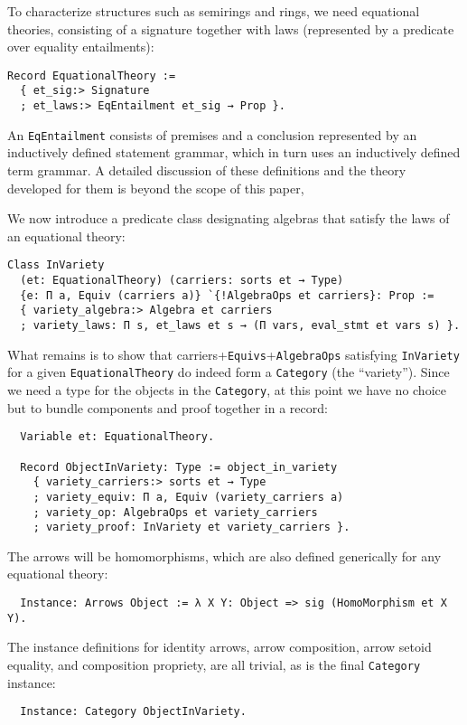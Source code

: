 \documentclass[a4paper,10pt,runningheads]{llncs}
\begin{document}
To characterize structures such as semirings and rings, we need equational theories, consisting of a signature together with laws (represented by a predicate over equality entailments):
\begin{lstlisting}
Record EquationalTheory :=
  { et_sig:> Signature
  ; et_laws:> EqEntailment et_sig → Prop }.
\end{lstlisting}
An \lstinline|EqEntailment| consists of premises and a conclusion represented by an inductively defined statement grammar, which in turn uses an inductively defined term grammar. A detailed discussion of these definitions and the theory developed for them is beyond the scope of this paper, 

We now introduce a predicate class designating algebras that satisfy the laws of an equational theory:
\begin{lstlisting}
Class InVariety
  (et: EquationalTheory) (carriers: sorts et → Type)
  {e: Π a, Equiv (carriers a)} `{!AlgebraOps et carriers}: Prop :=
  { variety_algebra:> Algebra et carriers
  ; variety_laws: Π s, et_laws et s → (Π vars, eval_stmt et vars s) }.
\end{lstlisting}

What remains is to show that carriers+\lstinline|Equivs|+\lstinline|AlgebraOps| satisfying \lstinline|InVariety| for a given \lstinline|EquationalTheory| do indeed form a \lstinline|Category| (the ``variety''). Since we need a type for the objects in the \lstinline|Category|, at this point we have no choice but to bundle components and proof together in a record:
\begin{lstlisting}
  Variable et: EquationalTheory.

  Record ObjectInVariety: Type := object_in_variety
    { variety_carriers:> sorts et → Type
    ; variety_equiv: Π a, Equiv (variety_carriers a)
    ; variety_op: AlgebraOps et variety_carriers
    ; variety_proof: InVariety et variety_carriers }.
\end{lstlisting}
The arrows will be homomorphisms, which are also defined generically for any equational theory:

\begin{lstlisting}
  Instance: Arrows Object := λ X Y: Object => sig (HomoMorphism et X Y).
\end{lstlisting}

The instance definitions for identity arrows, arrow composition, arrow setoid equality, and composition propriety, are all trivial, as is the final \lstinline|Category| instance:
\begin{lstlisting}
  Instance: Category ObjectInVariety.
\end{lstlisting}
\end{document}
